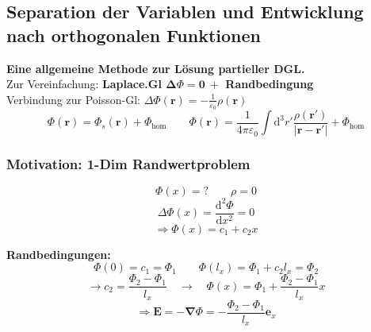 \documentclass[titlepage,11pt,a4paper,ngerman]{report}
\newcommand{\tx}[1]{\textrm{#1}}
\newcommand{\dd}{\tx{d}}
\renewcommand{\Phi}{\varPhi}
\newcommand{\kq}{\frac{1}{4\pi\epsilon_0}}
\renewcommand{\vec}[1]{\boldsymbol{#1}}
\renewcommand{\epsilon}{\varepsilon}
\begin{document}
\subsection{Separation der Variablen und Entwicklung nach orthogonalen Funktionen}

\textbf{Eine allgemeine Methode zur Lösung partieller DGL.}\\[5pt]
Zur Vereinfachung: \textbf{Laplace.Gl $ \boldsymbol{ \Delta \Phi = 0 \ +} $ Randbedingung}\\[5pt]
Verbindung zur Poisson-Gl: $ \Delta \Phi(\vec{r}) = - \frac{1}{\epsilon_0} \rho(\vec{r}) $
\begin{equation*}
\Phi(\vec{r}) = \Phi_s(\vec{r}) + \Phi_{\tx{hom}} \qquad \Phi(\vec{r}) = \kq \int \dd^3 r' \frac{\rho(\vec{r}')}{|\vec{r} - \vec{r}'|} + \Phi_{\tx{hom}}
\end{equation*}

\subsubsection{Motivation: 1-Dim Randwertproblem}

\begin{minipage}{.5\linewidth}
	\centering
	\vspace{5pt}
\end{minipage}
\begin{minipage}{.5\linewidth}
	$$ \Phi(x) = ? \qquad \rho = 0 $$
	\begin{equation*}
	\Delta \Phi(x) = \frac{\dd^2 \Phi}{\dd x^2} = 0
	\end{equation*}
	\begin{equation*}
	\Rightarrow \Phi(x) = c_1 + c_2 x
	\end{equation*}
\end{minipage}
\textbf{Randbedingungen:}\\
$$ \Phi(0) = c_1 = \Phi_1  \qquad \Phi(l_x) = \Phi_1 + c_2 l_x = \Phi_2 $$
\begin{equation*}
\rightarrow c_2 = \frac{\Phi_2 - \Phi_1}{l_x} \quad \rightarrow \quad \Phi(x) = \Phi_1 + \frac{\Phi_2 - \Phi_1}{l_x} x
\end{equation*}
\begin{equation*}
\Rightarrow \vec{E} = - \vec{\nabla} \Phi = - \frac{\Phi_2 - \Phi_1}{l_x} \vec{e}_x
\end{equation*}
\end{document}
